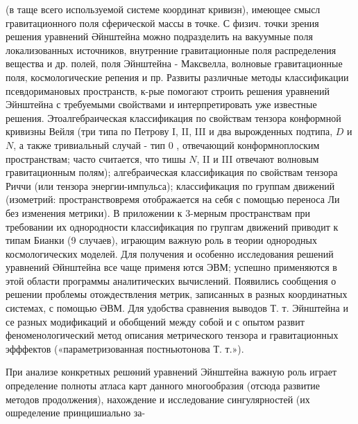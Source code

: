 \documentclass[10pt]{article}
\begin{document}
(в таще всего используемой системе координат кривизн), имеющее смысл гравитационного поля сферической массы в точке. С физич. точки зрения решения уравнений Әйнштейна можно подразделить на вакуумные поля локализованных источников, внутренние гравитационные поля распределения вещества и др. полей, поля Эйнштейна - Максвелла, волновые гравитационные поля, космологические репения и пр. Развиты различные методы классификации псевдоримановых пространств, к-рые помогают строить решения уравнений Эйнштейна с требуемыми свойствами и интерпретировать уже известные решения. Этоалгебраическая классификация по свойствам тензора конформной кривизны Вейля (три типа по Петрову I, II, III и два вырожденных подтипа, $D$ и $N$, а также тривиальный случай - тип 0 , отвечающий конформноплоским пространствам; часто считается, что тишы $N$, II и III отвечают волновым гравитационным полям); алгебраическая классификация по свойствам тензора Риччи (или тензора энергии-импульса); классификация по группам движений (изометрий: пространствовремя отображается на себя с помощью переноса Ли без изменения метрики). В приложении к 3-мерным пространствам при требовании их однородности классификация по групгам движений приводит к типам Бианки (9 случаев), играющим важную роль в теории однородных космологических моделей. Для получения и особенно исследования решений уравнений Әйнштейна все чаще применя ются ЭВМ; успешно применяются в этой области программы аналитических вычислений. Появились сообщения о решении проблемы отождествления метрик, записанных в разных координатных системах, с помощью ӘВМ. Для удобства сравнения выводов Т. т. Эйнштейна и се разных модификаций и обобщений между собой и с опытом развит феноменологический метод описания метрического тензора и гравитационных эфффектов («параметризованная постньютонова Т. т.»).



При анализе конкретных решөний уравнений Эйнштейна важную роль играет определение полноты атласа карт данного многообразия (отсюда развитие методов продолжения), нахождение и исследование сингулярностей (их ошределение принцишиально за-
\end{document}
